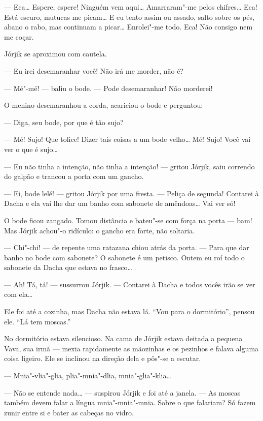 --- Eca\ldots{} Espere, espere! Ninguém vem aqui\ldots{} Amarraram"-me pelos
chifres\ldots{} Eca! Está escuro, mutucas me picam\ldots{} E eu tento assim ou
assado, salto sobre os pés, abano o rabo, mas continuam a picar\ldots{}
Enrolei"-me todo. Eca! Não consigo nem me coçar.

Jórjik se aproximou com cautela.

--- Eu irei desemaranhar você! Não irá me morder, não é?

--- Mé"-mé! --- baliu o bode. --- Pode desemaranhar! Não morderei!

O menino desemaranhou a corda, acariciou o bode e perguntou:

--- Diga, seu bode, por que é tão sujo?

--- Mé! Sujo! Que tolice! Dizer tais coisas a um bode velho\ldots{} Mé! Sujo!
Você vai ver o que é sujo\ldots{}

--- Eu não tinha a intenção, não tinha a intenção! --- gritou Jórjik,
saiu correndo do galpão e trancou a porta com um gancho.

--- Ei, bode lelé! --- gritou Jórjik por uma fresta. --- Peliça de
segunda! Contarei à Dacha e ela vai lhe dar um banho com sabonete de
amêndoas\ldots{} Vai ver só!

O bode ficou zangado. Tomou distância e bateu"-se com força na porta ---
bam! Mas Jórjik achou"-o ridículo: o gancho era forte, não soltaria.

--- Chi"-chi! --- de repente uma ratazana chiou atrás da porta. --- Para
que dar banho no bode com sabonete? O sabonete é um petisco. Ontem eu
roí todo o sabonete da Dacha que estava no frasco\ldots{}

--- Ah! Tá, tá! --- sussurrou Jórjik. --- Contarei à Dacha e todos vocês
irão se ver com ela\ldots{}

Ele foi até a cozinha, mas Dacha não estava lá. ``Vou para o
dormitório'', pensou ele. ``Lá tem moscas.''

No dormitório estava silencioso. Na cama de Jórjik estava deitada a
pequena Vava, sua irmã --- mexia rapidamente as mãozinhas e os pezinhos
e falava alguma coisa ligeiro. Ele se inclinou na direção dela e pôs"-se
a escutar.

--- Mnia"-vlia"-glia, plia"-mnia"-dlia, mnia"-glia"-klia\ldots{}

--- Não se entende nada\ldots{} --- suspirou Jórjik e foi até a janela. ---
As moscas também devem falar a língua mnia"-mnia"-mnia. Sobre o que
falariam? Só fazem zunir entre si e bater as cabeças no vidro.


